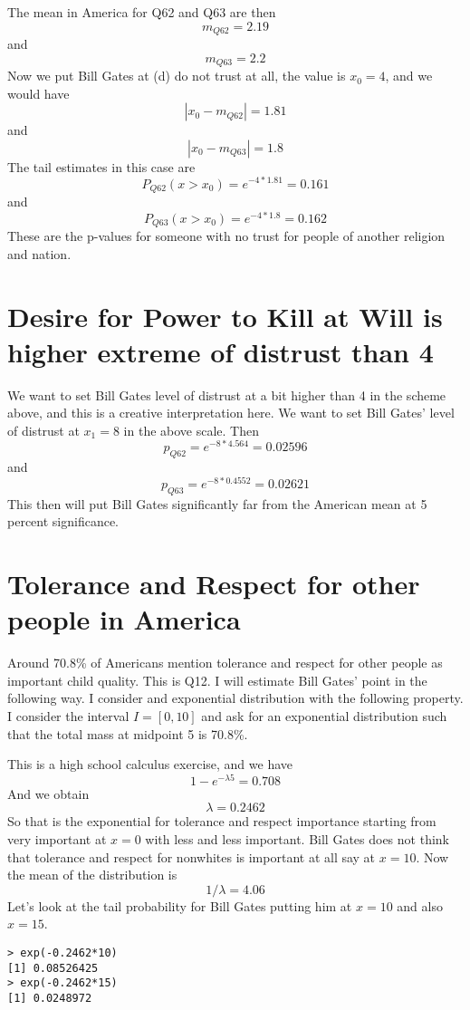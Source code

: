 \documentclass{amsart}
\begin{document}
The mean in America for Q62 and Q63 are then
\[
m_{Q62} = 2.19
\]
and
\[
m_{Q63} = 2.2
\]
Now we put Bill Gates at (d) do not trust at all, the value is $x_0=4$, and we would have
\[
| x_0 - m_{Q62} | = 1.81
\]
and
\[
| x_0 - m_{Q63} | = 1.8
\]
The tail estimates in this case are
\[
P_{Q62}( x > x_0 ) = e^{-4*1.81} = 0.161
\]
and
\[
P_{Q63}( x > x_0 ) = e^{-4*1.8} = 0.162
\]
These are the p-values for someone with no trust for people of another religion and nation.

\section{Desire for Power to Kill at Will is higher extreme of distrust than 4}

We want to set Bill Gates level of distrust at a bit higher than 4 in the scheme above, and this is a creative interpretation here.  We want to set Bill Gates' level of distrust at $x_1 = 8$ in the above scale.  Then
\[
p_{Q62} = e^{-8*4.564} = 0.02596
\]
and
\[
p_{Q63} = e^{-8*0.4552} = 0.02621
\]
This then will put Bill Gates significantly far from the American mean at 5 percent significance.

\section{Tolerance and Respect for other people in America}

Around 70.8\% of Americans mention tolerance and respect for other people as important child quality.  This is Q12.  I will estimate Bill Gates' point in the following way.  I consider and exponential distribution with the following property.  I consider the interval $I=[0,10]$ and ask for an exponential distribution such that the total mass at midpoint 5 is 70.8\%.

This is a high school calculus exercise, and we have
\[
1 - e^{-\lambda 5} = 0.708
\]
And we obtain
\[
\lambda = 0.2462
\]
So that is the exponential for tolerance and respect importance starting from very important at $x=0$ with less and less important.  Bill Gates does not think that tolerance and respect for nonwhites is important at all say at $x=10$. Now the mean of the distribution is
\[
1/\lambda = 4.06
\]
Let's look at the tail probability for Bill Gates putting him at $x=10$ and also $x=15$.

\begin{verbatim}
> exp(-0.2462*10)
[1] 0.08526425
> exp(-0.2462*15)
[1] 0.0248972
\end{verbatim}
\end{document}
